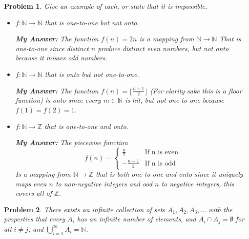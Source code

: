 \documentclass[12pt]{article}
\newtheorem{problem}{Problem}
\newcommand{\NN}{\ensuremath{\mathbb N}}
\newcommand{\ZZ}{\ensuremath{\mathbb Z}}
\begin{document}
\begin{problem} %
Give an example of each, or state that it is impossible.
\begin{itemize}
\item[(a)] $f:\NN\to\NN$ that is one-to-one but not onto.

	\textbf{My Answer: } The function $f(n) = 2n$ is a mapping from $\NN \rightarrow \NN$ That is one-to-one since distinct $n$ produce distinct even numbers, but not onto because it misses odd numbers.
\item[(b)] $f:\NN\to\NN$ that is onto but not one-to-one.

	\textbf{My Answer: } The function $f(n) = \lfloor\frac{n+1}{2}\rfloor$ (For clarity sake this is a floor function) is onto since every $m \in \NN$ is hit, but not one-to one because $f(1) = f(2) = 1 $. 
\item[(d)] $f:\NN\to\ZZ$ that is one-to-one and onto.

	\textbf{My Answer: } The piecewise function $$f(n) =\begin{cases} \frac{n}{2} & \text{If n is even} \\
	-\frac{n-1}{2} & \text{If n is odd}\end{cases} $$
		Is a mapping from $\NN \rightarrow \ZZ$ that is both one-to-one and onto since it uniquely maps even $n$ to non-negative integers and ood $n$ to negative integers, this covers all of $\ZZ$.
	

\end{itemize}
\end{problem}



\begin{problem} %
There exists an infinite collection of sets $A_1,A_2,A_3,\dots$ with the properties that every $A_i$ has an infinite number of elements, and $A_i\cap A_j=\emptyset$ for all $i\ne j$, and $\bigcup_{i=1}^\infty A_i=\NN$. \end{problem}
\end{document}
